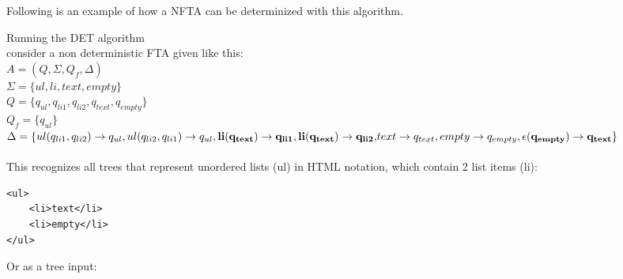 \documentclass{llncs}
\begin{document}
\pagebreak

\newcommand{\automatonDefinition} {
	\(A = (Q, \Sigma, Q_f, \Delta)\)
}

Following is an example of how a NFTA can be determinized with this algorithm.

	\begin{example}{Running the DET algorithm}
		\\
		consider a non deterministic FTA given like this:\\
		\automatonDefinition\\
		\(\Sigma = \{ul, li, text, empty\}\)\\
		\(Q = \{q_{ul}, q_{li1}, q_{li2}, q_{text}, q_{empty}\}\)\\
		\(Q_f = \{q_{ul}\}\)\\
		\(\Delta = \{
		ul(q_{li1},q_{li2}) \rightarrow q_{ul}, ul(q_{li2},q_{li1}) \rightarrow q_{ul}, \\
		\mathbf{li(q_{text}) \rightarrow q_{li1}, li(q_{text}) \rightarrow q_{li2},}\\
		text \rightarrow q_{text}, empty \rightarrow q_{empty}, \\
		\mathbf{\epsilon(q_{empty}) \rightarrow q_{text}}
		\}\)
		\\\\
		This recognizes all trees that represent unordered lists (ul) in HTML notation, which contain 2 list items (li):
			\lstset{
				basicstyle=\footnotesize, frame=tb,
				xleftmargin=.4\textwidth, xrightmargin=.5\textwidth
			}
			\begin{lstlisting}[frame=none]
<ul>
    <li>text</li>
    <li>empty</li>
</ul>
			\end{lstlisting}
			Or as a tree input:
			\begin{center}
\end{center}
\end{example}
\end{document}
